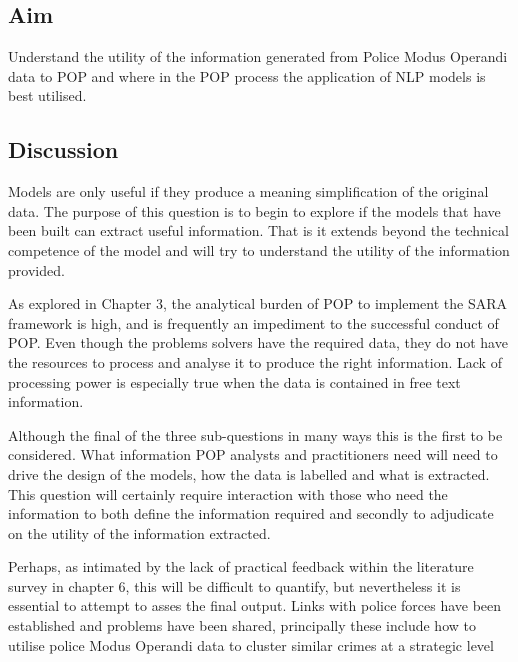 \subsection{Aim} Understand the utility of the information generated from Police Modus Operandi data to POP and where in the POP process the application of NLP models is best utilised.  


\subsection{Discussion} Models are only useful if they produce a meaning simplification of the original data. The purpose of this question is to begin to explore if the models that have been built can extract useful information. That is it extends beyond the technical competence of the model and will try to understand the utility of the information provided. 

As explored in Chapter 3, the analytical burden of POP to implement the SARA framework is high, and is frequently an impediment to the successful conduct of POP. Even though the problems solvers have the required data, they do not have the resources to process and analyse it to produce the right information. Lack of processing power is especially true when the data is contained in free text information. 

Although the final of the three sub-questions in many ways this is the first to be considered. What information POP analysts and practitioners need will need to drive the design of the models, how the data is labelled and what is extracted. This question will certainly require interaction with those who need the information to both define the information required and secondly to adjudicate on the utility of the information extracted.

Perhaps, as intimated by the lack of practical feedback within the literature survey in chapter 6, this will be difficult to quantify, but nevertheless it is essential to attempt to asses the final output. Links with police forces have been established and problems have been shared, principally these include how to utilise police Modus Operandi data to cluster similar crimes at a strategic level


